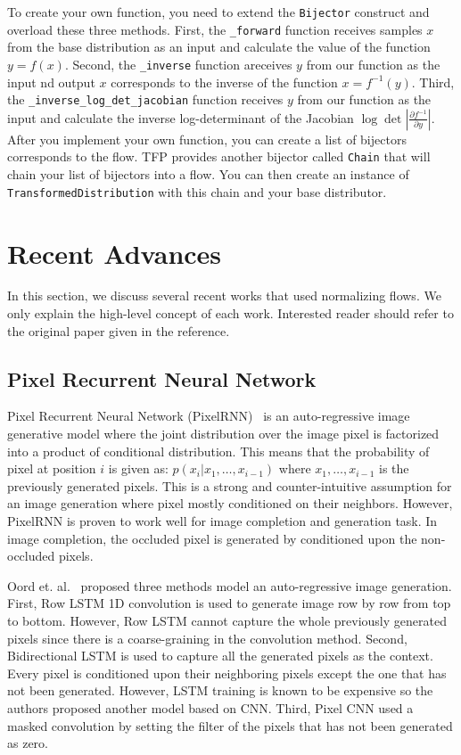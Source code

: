 \documentclass[runningheads]{llncs}
\begin{document}
To create your own function, you need to extend the \texttt{Bijector} construct and overload these three methods. First, the \texttt{\_forward} function receives samples $x$ from the base distribution as an input and calculate the value of the function $y = f(x)$. Second,  the \texttt{\_inverse} function areceives $y$ from our function as the input nd output $x$ corresponds to the inverse of the function $x = f^{-1}(y)$. Third, the \texttt{\_inverse\_log\_det\_jacobian} function receives $y$ from our function as the input and calculate the inverse log-determinant of the Jacobian $\log \det \left|\frac{\partial f^{-1}}{\partial y}\right|$. After you implement your own function, you can create a list of bijectors corresponds to the flow. TFP provides another bijector called \texttt{Chain} that will chain your list of bijectors into a flow. You can then create an instance of \texttt{TransformedDistribution} with this chain and your base distributor.   

\section{Recent Advances}
In this section, we discuss several recent works that used normalizing flows. We only explain the high-level concept of each work. Interested reader should refer to the original paper given in the reference.
\subsection{Pixel Recurrent Neural Network}
Pixel Recurrent Neural Network (PixelRNN)~\cite{oord2016pixel} is an auto-regressive image generative model where the joint distribution over the image pixel is factorized into a product of conditional distribution. This means that the probability of pixel at position $i$ is given as: $p(x_i | x_1, \dots, x_{i-1})$ where $x_1, \dots, x_{i-1}$ is the previously generated pixels. This is a strong and counter-intuitive assumption for an image generation where pixel mostly conditioned on their neighbors. However, PixelRNN is proven to  work well for image completion and generation task. In image completion, the occluded pixel is generated by conditioned upon the non-occluded pixels.

Oord et. al.~\cite{oord2016pixel} proposed three methods model an auto-regressive image generation.  First, Row LSTM 1D convolution is used to generate image row by row from top to bottom. However, Row LSTM cannot capture the whole previously generated pixels since there is a coarse-graining in the convolution method. Second, Bidirectional LSTM is used to capture all the generated pixels as the context. Every pixel is conditioned upon their neighboring pixels except the one that has not been generated. However, LSTM training is known to be expensive so the authors proposed another model based on CNN. Third, Pixel CNN used a masked convolution by setting the filter of the pixels that has not been generated as zero.
\end{document}
